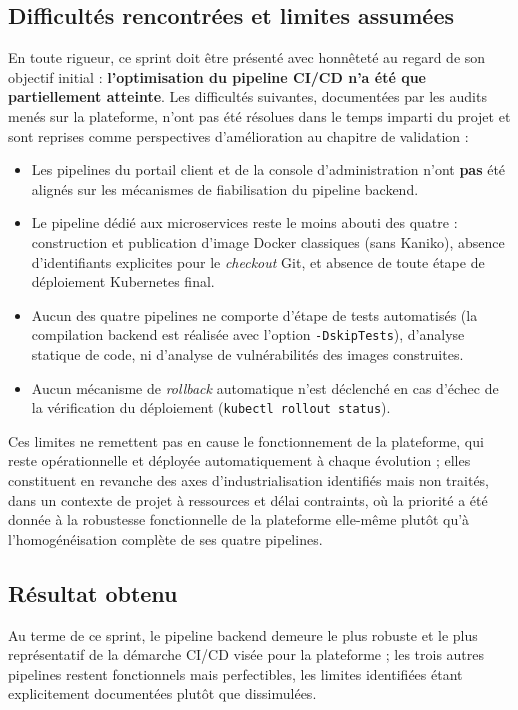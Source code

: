 \subsection{Difficultés rencontrées et limites assumées}

En toute rigueur, ce sprint doit être présenté avec honnêteté au regard de son objectif initial : \textbf{l'optimisation du pipeline CI/CD n'a été que partiellement atteinte}. Les difficultés suivantes, documentées par les audits menés sur la plateforme, n'ont pas été résolues dans le temps imparti du projet et sont reprises comme perspectives d'amélioration au chapitre de validation :

\begin{itemize}
    \item Les pipelines du portail client et de la console d'administration n'ont \textbf{pas} été alignés sur les mécanismes de fiabilisation du pipeline backend.
    \item Le pipeline dédié aux microservices reste le moins abouti des quatre : construction et publication d'image Docker classiques (sans Kaniko), absence d'identifiants explicites pour le \textit{checkout} Git, et absence de toute étape de déploiement Kubernetes final.
    \item Aucun des quatre pipelines ne comporte d'étape de tests automatisés (la compilation backend est réalisée avec l'option \texttt{-DskipTests}), d'analyse statique de code, ni d'analyse de vulnérabilités des images construites.
    \item Aucun mécanisme de \textit{rollback} automatique n'est déclenché en cas d'échec de la vérification du déploiement (\texttt{kubectl rollout status}).
\end{itemize}

Ces limites ne remettent pas en cause le fonctionnement de la plateforme, qui reste opérationnelle et déployée automatiquement à chaque évolution ; elles constituent en revanche des axes d'industrialisation identifiés mais non traités, dans un contexte de projet à ressources et délai contraints, où la priorité a été donnée à la robustesse fonctionnelle de la plateforme elle-même plutôt qu'à l'homogénéisation complète de ses quatre pipelines.

\subsection{Résultat obtenu}

Au terme de ce sprint, le pipeline backend demeure le plus robuste et le plus représentatif de la démarche CI/CD visée pour la plateforme ; les trois autres pipelines restent fonctionnels mais perfectibles, les limites identifiées étant explicitement documentées plutôt que dissimulées.

